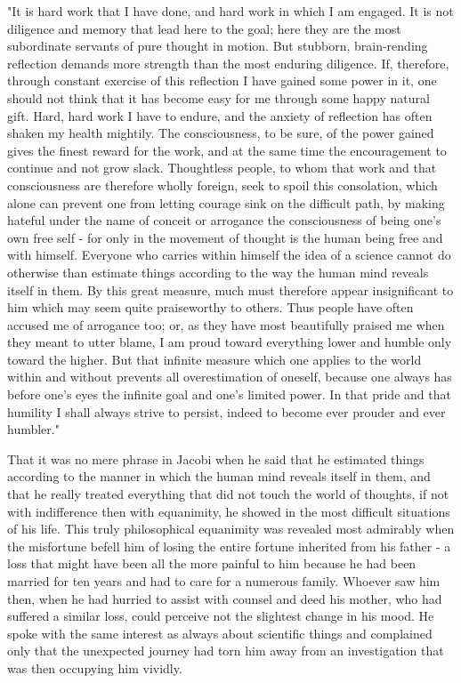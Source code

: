 \documentclass[11pt]{article}
\begin{document}
"It is hard work that I have done, and hard work in which I am engaged. It is not diligence and memory that lead here to the goal; here they are the most subordinate servants of pure thought in motion. But stubborn, brain-rending reflection demands more strength than the most enduring diligence. If, therefore, through constant exercise of this reflection I have gained some power in it, one should not think that it has become easy for me through some happy natural gift. Hard, hard work I have to endure, and the anxiety of reflection has often shaken my health mightily. The consciousness, to be sure, of the power gained gives the finest reward for the work, and at the same time the encouragement to continue and not grow slack. Thoughtless people, to whom that work and that consciousness are therefore wholly foreign, seek to spoil this consolation, which alone can prevent one from letting courage sink on the difficult path, by making hateful under the name of conceit or arrogance the consciousness of being one's own free self - for only in the movement of thought is the human being free and with himself. Everyone who carries within himself the idea of a science cannot do otherwise than estimate things according to the way the human mind reveals itself in them. By this great measure, much must therefore appear insignificant to him which may seem quite praiseworthy to others. Thus people have often accused me of arrogance too; or, as they have most beautifully praised me when they meant to utter blame, I am proud toward everything lower and humble only toward the higher. But that infinite measure which one applies to the world within and without prevents all overestimation of oneself, because one always has before one's eyes the infinite goal and one's limited power. In that pride and that humility I shall always strive to persist, indeed to become ever prouder and ever humbler."

That it was no mere phrase in Jacobi when he said that he estimated things according to the manner in which the human mind reveals itself in them, and that he really treated everything that did not touch the world of thoughts, if not with indifference then with equanimity, he showed in the most difficult situations of his life. This truly philosophical equanimity was revealed most admirably when the misfortune befell him of losing the entire fortune inherited from his father - a loss that might have been all the more painful to him because he had been married for ten years and had to care for a numerous family. Whoever saw him then, when he had hurried to assist with counsel and deed his mother, who had suffered a similar loss, could perceive not the slightest change in his mood. He spoke with the same interest as always about scientific things and complained only that the unexpected journey had torn him away from an investigation that was then occupying him vividly.
\end{document}
